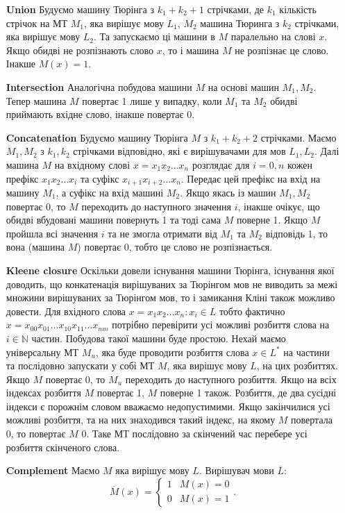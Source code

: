 \documentclass[12pt,letterpaper]{article}
\begin{document}
\begin{itemize}
    \item[\textbf{Union}] Будуємо машину Тюрінга з $k_1 + k_2 + 1$ стрічками, де $k_1$ кількість стрічок на МТ $M_1$, яка вирішує мову $L_1$, $M_2$ машина Тюринга з $k_2$ стрічками, яка вирішує мову $L_2$. Та запускаємо ці машини в $M$ паралельно на слові $x$. Якщо обидві не розпізнають слово $x$, то і машина $M$ не розпізнає це слово. Інакше $M(x) = 1$.
    \item[\textbf{Intersection}] Аналогічна побудова машини $M$ на основі машин $M_1, M_2$. Тепер машина $M$ повертає 1 лише у випадку, коли $M_1$ та $M_2$ обидві приймають вхідне слово, інакше повертає 0.
    \item[\textbf{Concatenation}] Будуємо машину Тюрінга $M$ з $k_1 + k_2 + 2$ стрічками. Маємо $M_1, M_2$ з $k_1, k_2$ стрічками відповідно, які є вирішувачами для мов $L_1, L_2$.
        Далі машина $M$ на вхідному слові $x = x_1 x_2 \dots x_n$ розглядає для $i = \overline{0, n}$ кожен префікс $x_1 x_2 \dots x_i$ та суфікс $x_{i+1} x_{i+2} \dots x_n$. Передає цей префікс на вхід на машину $M_1$, а суфікс на вхід машині $M_2$. Якщо якась із машин $M_1, M_2$ повертає 0, то $M$ переходить до наступного значення $i$, інакше очікує, що обидві вбудовані машини повернуть 1 та тоді сама $M$ поверне 1. Якщо $M$ пройшла всі значення $i$ та не змогла отримати від $M_1$ та $M_2$ відповідь 1, то вона (машина $M$) повертає 0, тобто це слово не розпізнається.
    \item[\textbf{Kleene closure}] Оскільки довели існування машини Тюрінга, існування якої доводить, що 
        конкатенація вирішуваних за Тюрінгом мов не виводить за межі множини вирішуваних за Тюрінгом мов, то і замикання Кліні також можливо довести. Для вхідного слова $x = x_1 x_2 \dots x_n : x_i \in L$ тобто фактично $x = x_{00} x_{01} \dots x_{10} x_{11} \dots x_{nm}$ потрібно перевірити усі можливі розбиття слова на $i \in \mathbb{N}$ частин.
        Побудова такої машини буде простою. Нехай маємо універсальну МТ $M_u$, яка буде проводити розбиття слова $x \in L^*$ на частини та послідовно запускати у собі МТ $M$, яка вирішує мову $L$, на цих розбиттях. Якщо $M$ повертає 0, то $M_u$ переходить до наступного розбиття. Якщо на всіх індексах розбиття $M$ повертає 1, $M$ поверне 1 також. Розбиття, де два сусідні індекси є порожнім словом вважаємо недопустимими. Якщо закінчилися усі можливі розбиття, та на них знаходився такий індекс, на якому $M$ повертала 0, то повертає $M$ 0. Таке МТ послідовно за скінчений час перебере усі розбиття скінченого слова.
    \item[\textbf{Complement}] Маємо $M$ яка вирішує мову $L$. Вирішувач мови $\overline{L}$:
        \[
            \overline{M}(x) = \begin{cases}
                1 & M(x) = 0 \\
                0 & M(x) = 1
            \end{cases}
        .\] 
\end{itemize}
\end{document}
